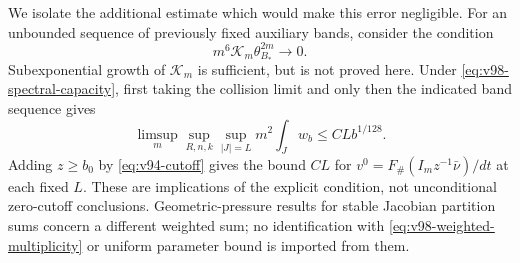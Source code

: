 We isolate the additional estimate which would make this error
negligible. For an unbounded sequence of previously fixed auxiliary
bands, consider the condition
\begin{equation}\label{eq:v98-spectral-capacity}
       m^6\mathcal K_m\theta_{B_*}^{2m}\longrightarrow0.
                         \tag{SC}
\end{equation}
Subexponential growth of $\mathcal K_m$ is sufficient, but is not
proved here. Under \eqref{eq:v98-spectral-capacity}, first taking the
collision limit and only then the indicated band sequence gives
\begin{equation}\label{eq:v98-uncut-limit}
 \limsup_m\sup_{R,n,k}\sup_{|J|=L}m^2\int_Jw_b
                          \le C Lb^{1/128}.
\end{equation}
Adding $z\ge b_0$ by \eqref{eq:v94-cutoff} gives the bound $CL$
for $v^0=F_\#(I_mz^{-1}\bar\nu)/dt$ at each fixed $L$.
These are implications of the explicit condition, not unconditional
zero-cutoff conclusions. Geometric-pressure results for stable
Jacobian partition sums \cite{BDPressure} concern a different
weighted sum; no identification with \eqref{eq:v98-weighted-multiplicity}
or uniform parameter bound is imported from them.
